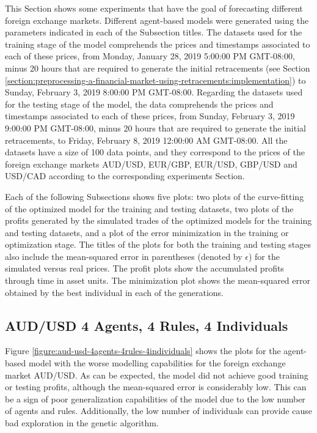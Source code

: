 This Section shows some experiments that have the goal of forecasting different
foreign exchange markets. Different agent-based models were generated using the
parameters indicated in each of the Subsection titles. The datasets used for the
training stage of the model comprehends the prices and timestamps associated to
each of these prices, from Monday, January 28, 2019 5:00:00 PM GMT-08:00, minus
20 hours that are required to generate the initial retracements (see Section
\ref{section:preprocessing-a-financial-market-using-retracements:implementation})
to Sunday, February 3, 2019 8:00:00 PM GMT-08:00. Regarding the datasets used
for the testing stage of the model, the data comprehends the prices and
timestamps associated to each of these prices, from Sunday, February 3, 2019
9:00:00 PM GMT-08:00, minus 20 hours that are required to generate the initial
retracements, to Friday, February 8, 2019 12:00:00 AM GMT-08:00. All the
datasets have a size of 100 data points, and they correspond to the prices of
the foreign exchange markets AUD/USD, EUR/GBP, EUR/USD, GBP/USD and USD/CAD
according to the corresponding experiments Section.

Each of the following Subsections shows five plots: two plots of the
curve-fitting of the optimized model for the training and testing datasets, two
plots of the profits generated by the simulated trades of the optimized models
for the training and testing datasets, and a plot of the error minimization in
the training or optimization stage. The titles of the plots for both the
training and testing stages also include the mean-squared error in parentheses
(denoted by $\epsilon$) for the simulated versus real prices. The profit plots
show the accumulated profits through time in asset units. The minimization plot
shows the mean-squared error obtained by the best individual in each of the
generations.

\newpage

\subsection{AUD/USD 4 Agents, 4 Rules, 4 Individuals}
\label{results:forecast-aud-usd-4agents-4rules-4individuals}

Figure \ref{figure:aud-usd-4agents-4rules-4individuals} shows the plots for the
agent-based model with the worse modelling capabilities for the foreign exchange
market AUD/USD. As can be expected, the model did not achieve good training or
testing profits, although the mean-squared error is considerably low. This can
be a sign of poor generalization capabilities of the model due to the low number
of agents and rules. Additionally, the low number of individuals can provide
cause bad exploration in the genetic algorithm.

